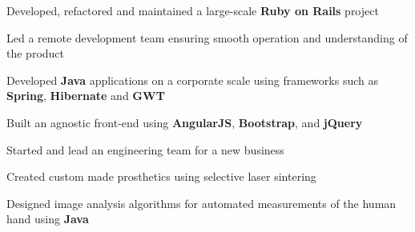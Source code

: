 \documentclass[]{resume}
\begin{document}
\begin{minipage}[t]{0.66\textwidth}
\begin{tightemize}
\item Developed, refactored and maintained a large-scale \textbf{Ruby on Rails} project
\item Led a remote development team ensuring smooth operation and understanding of the product
\end{tightemize}
\sectionsep

\begin{tightemize}
\item Developed \textbf{Java} applications on a corporate scale using frameworks such as \textbf{Spring}, \textbf{Hibernate} and \textbf{GWT}
\item Built an agnostic front-end using \textbf{AngularJS}, \textbf{Bootstrap}, and \textbf{jQuery}
\end{tightemize}
\sectionsep



\begin{tightemize}
\item Started and lead an engineering team for a new business
\item Created custom made prosthetics using selective laser sintering
\item Designed image analysis algorithms for automated measurements of the human hand using \textbf{Java}
\end{tightemize}
\sectionsep


\end{minipage}
\end{document}
